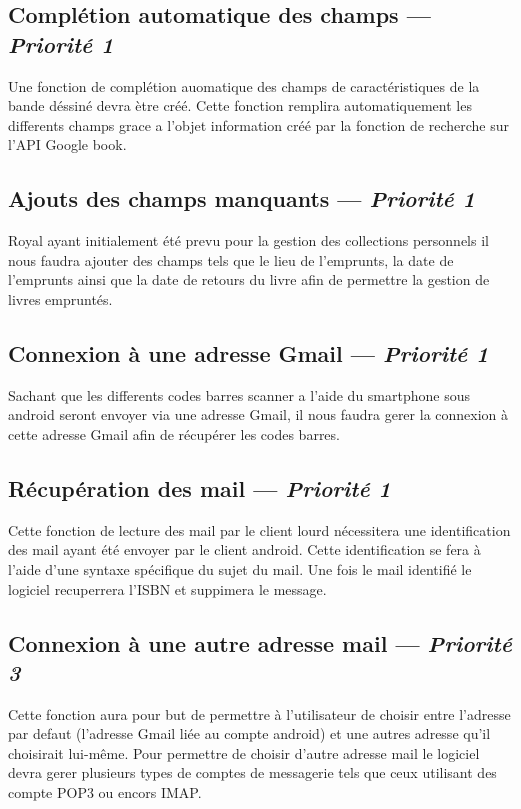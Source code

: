 \subsection[Complétion automatique des champs]{Complétion automatique des champs — \emph{Priorité 1}}
Une fonction de complétion auomatique des champs de caractéristiques de la bande déssiné devra ètre créé. Cette fonction remplira automatiquement les differents champs grace a l'objet information créé par la fonction de recherche sur l'API Google book.

\subsection[Ajouts des champs manquants]{Ajouts des champs manquants — \emph{Priorité 1}}
Royal ayant initialement été prevu pour la gestion des collections personnels il nous faudra ajouter des champs tels que le lieu de l'emprunts, la date de l'emprunts ainsi que la date de retours du livre afin de permettre la gestion de livres empruntés. 

\subsection[Connexion à une adresse Gmail]{Connexion à une adresse Gmail — \emph{Priorité 1}} 
Sachant que les differents codes barres scanner a l'aide du smartphone sous android seront envoyer via une adresse Gmail, il nous faudra gerer la connexion à cette adresse Gmail afin de récupérer les codes barres.

\subsection[Récupération des mail]{Récupération des mail — \emph{Priorité 1}} 
Cette fonction de lecture des mail par le client lourd nécessitera une identification des mail ayant été envoyer par le client android. Cette identification se fera à l'aide d'une syntaxe spécifique du sujet du mail. Une fois le mail identifié le logiciel recuperrera l'ISBN et suppimera le message. 




\subsection[Connexion à une autre adresse mail]{Connexion à une autre adresse mail — \emph{Priorité 3}}
Cette fonction aura pour but de permettre à l'utilisateur de choisir entre l'adresse par defaut (l'adresse Gmail liée au compte android) et une autres adresse qu'il choisirait lui-même. Pour permettre de choisir d'autre adresse mail le logiciel devra gerer plusieurs types de comptes de messagerie tels que ceux utilisant des compte POP3 ou encors IMAP.

